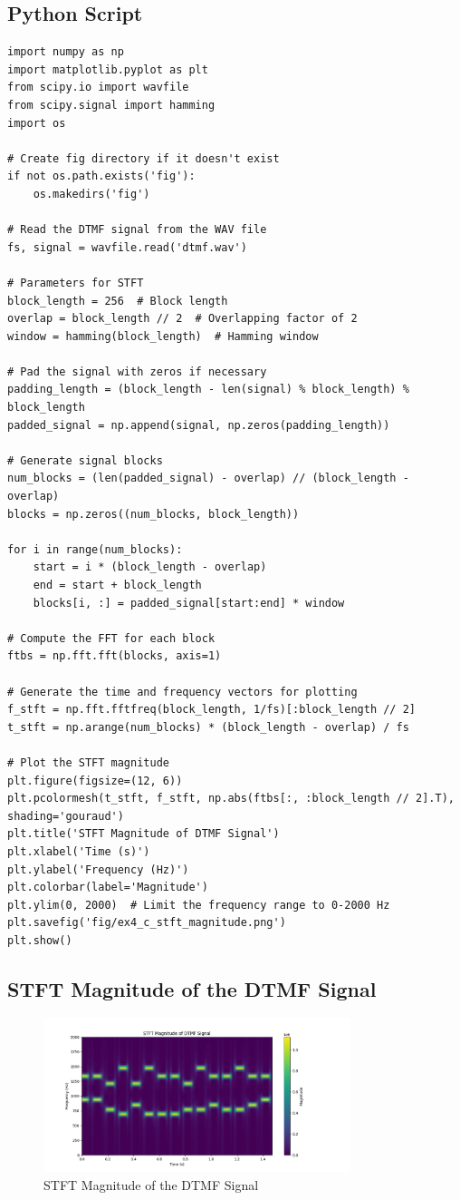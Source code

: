 \subsection*{Python Script}
\begin{verbatim}
import numpy as np
import matplotlib.pyplot as plt
from scipy.io import wavfile
from scipy.signal import hamming
import os

# Create fig directory if it doesn't exist
if not os.path.exists('fig'):
    os.makedirs('fig')

# Read the DTMF signal from the WAV file
fs, signal = wavfile.read('dtmf.wav')

# Parameters for STFT
block_length = 256  # Block length
overlap = block_length // 2  # Overlapping factor of 2
window = hamming(block_length)  # Hamming window

# Pad the signal with zeros if necessary
padding_length = (block_length - len(signal) % block_length) % block_length
padded_signal = np.append(signal, np.zeros(padding_length))

# Generate signal blocks
num_blocks = (len(padded_signal) - overlap) // (block_length - overlap)
blocks = np.zeros((num_blocks, block_length))

for i in range(num_blocks):
    start = i * (block_length - overlap)
    end = start + block_length
    blocks[i, :] = padded_signal[start:end] * window

# Compute the FFT for each block
ftbs = np.fft.fft(blocks, axis=1)

# Generate the time and frequency vectors for plotting
f_stft = np.fft.fftfreq(block_length, 1/fs)[:block_length // 2]
t_stft = np.arange(num_blocks) * (block_length - overlap) / fs

# Plot the STFT magnitude
plt.figure(figsize=(12, 6))
plt.pcolormesh(t_stft, f_stft, np.abs(ftbs[:, :block_length // 2].T), shading='gouraud')
plt.title('STFT Magnitude of DTMF Signal')
plt.xlabel('Time (s)')
plt.ylabel('Frequency (Hz)')
plt.colorbar(label='Magnitude')
plt.ylim(0, 2000)  # Limit the frequency range to 0-2000 Hz
plt.savefig('fig/ex4_c_stft_magnitude.png')
plt.show()
\end{verbatim}

\subsection*{STFT Magnitude of the DTMF Signal}
\begin{figure}[h]
    \centering
    \includegraphics[width=0.8\textwidth]{fig/ex4_c_stft_magnitude.png}
    \caption{STFT Magnitude of the DTMF Signal}
    \label{fig:ex4_c_stft_magnitude}
\end{figure}

